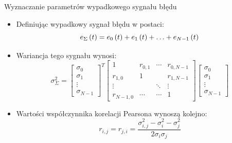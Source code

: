 \documentclass[12pt, polish, aspectratio = 169]{beamer}
\begin{document}
\begin{frame}{Wyznaczanie parametrów wypadkowego sygnału błędu}
\begin{itemize}
\item Definiując wypadkowy sygnał błędu w postaci:
\begin{equation}
e_{\Sigma} \left(t\right) = e_{0} \left(t\right) + e_{1} \left(t\right) + \hdots + e_{N-1} \left(t\right) \label{eq:err_sum}
\end{equation}
\item Wariancja tego sygnału wynosi:
\begin{equation}
\sigma_{\Sigma}^{2} =
\begin{bmatrix}
\sigma_{0} \\ \sigma_{1} \\ \vdots \\ \sigma_{N-1}
\end{bmatrix}^{T}
\begin{bmatrix}
1         & r_{0,1} & \cdots & r_{0,N-1} \\
r_{1,0}   & 1       &        & r_{1,N-1} \\
\vdots    &         & \ddots & \vdots    \\
r_{N-1,0} & \cdots  & \cdots & 1
\end{bmatrix}
\begin{bmatrix}
\sigma_{0} \\ \sigma_{1} \\ \vdots \\ \sigma_{N-1}
\end{bmatrix}
\label{eq:var_matrix}
\end{equation}
\item Wartości współczynnika korelacji Pearsona wynoszą kolejno:
\begin{equation}
r_{i,j} = r_{j,i} = \frac{\sigma_{i,j}^{2} - \sigma_{i}^{2} - \sigma_{j}^{2}}{2 \sigma_{i} \sigma_{j}} \label{eq:var_corr}
\end{equation}
\end{itemize}
\end{frame}
\end{document}
